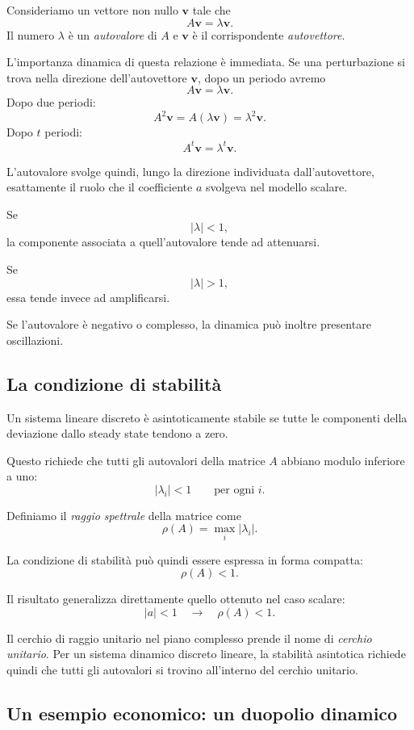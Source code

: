 \documentclass{book}
\begin{document}
Consideriamo un vettore non nullo $\mathbf{v}$ tale che
\[
A\mathbf{v}=\lambda\mathbf{v}.
\]
Il numero $\lambda$ è un \emph{autovalore} di $A$ e $\mathbf{v}$ è il
corrispondente \emph{autovettore}.

L'importanza dinamica di questa relazione è immediata. Se una perturbazione
si trova nella direzione dell'autovettore $\mathbf{v}$, dopo un periodo
avremo
\[
A\mathbf{v}=\lambda\mathbf{v}.
\]
Dopo due periodi:
\[
A^2\mathbf{v}
=
A(\lambda\mathbf{v})
=
\lambda^2\mathbf{v}.
\]
Dopo $t$ periodi:
\[
A^t\mathbf{v}
=
\lambda^t\mathbf{v}.
\]

L'autovalore svolge quindi, lungo la direzione individuata
dall'autovettore, esattamente il ruolo che il coefficiente $a$ svolgeva nel
modello scalare.

Se
\[
|\lambda|<1,
\]
la componente associata a quell'autovalore tende ad attenuarsi.

Se
\[
|\lambda|>1,
\]
essa tende invece ad amplificarsi.

Se l'autovalore è negativo o complesso, la dinamica può inoltre presentare
oscillazioni.


\subsection{La condizione di stabilità}

Un sistema lineare discreto è asintoticamente stabile se tutte le componenti
della deviazione dallo steady state tendono a zero.

Questo richiede che tutti gli autovalori della matrice $A$ abbiano modulo
inferiore a uno:
\[
|\lambda_i|<1
\qquad
\text{per ogni }i.
\]

Definiamo il \emph{raggio spettrale} della matrice come
\[
\rho(A)
=
\max_i|\lambda_i|.
\]

La condizione di stabilità può quindi essere espressa in forma compatta:
\[
\boxed{\rho(A)<1}.
\]

Il risultato generalizza direttamente quello ottenuto nel caso scalare:
\[
|a|<1
\quad\longrightarrow\quad
\rho(A)<1.
\]

Il cerchio di raggio unitario nel piano complesso prende il nome di
\emph{cerchio unitario}. Per un sistema dinamico discreto lineare, la
stabilità asintotica richiede quindi che tutti gli autovalori si trovino
all'interno del cerchio unitario.


\subsection{Un esempio economico: un duopolio dinamico}
\end{document}
